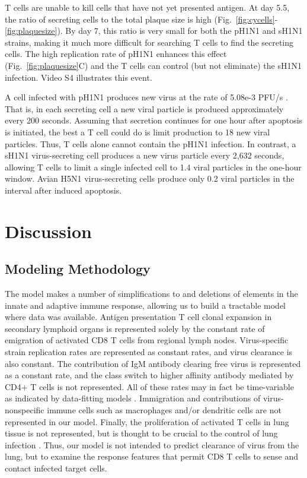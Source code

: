 \documentclass[10pt]{article}
\begin{document}
T cells are unable to kill cells that have not yet presented antigen.  At day 5.5, the ratio of secreting cells to the total plaque size is high (Fig.~\ref{fig:cycells}-\ref{fig:plaquesize}). By day 7, this ratio is very small for both the pH1N1 and sH1N1 strains, making it much more difficult for searching T cells to find the secreting cells.  The high replication rate of pH1N1 enhances this effect (Fig.~\ref{fig:plaquesize}C) and the T cells can control (but not eliminate) the sH1N1 infection.  Video S4 illustrates this event.

A cell infected with pH1N1 produces new virus at the rate of 5.08e-3 PFU/s \cite{Mitchell2011}.  That is, in each secreting cell a new viral particle is produced approximately every 200 seconds.  Assuming that secretion continues for one hour after apoptosis is initiated, the best a T cell could do is limit production to 18 new viral particles.  Thus, T cells alone cannot contain the pH1N1 infection.  In contrast, a sH1N1 virus-secreting cell produces a new virus particle every 2,632 seconds, allowing T cells to limit a single infected cell to 1.4 viral particles in the one-hour window.  Avian H5N1 virus-secreting cells produce only 0.2 viral particles in the interval after induced apoptosis. 


\section*{Discussion}

\subsection*{Modeling Methodology}

The model makes a number of simplifications to and deletions of elements in the innate and adaptive immune response, allowing us to build a tractable model where data was available.  Antigen presentation T cell clonal expansion in secondary lymphoid organs is represented solely by the constant rate of emigration of activated CD8 T cells from regional lymph nodes.  Virus-specific strain replication rates are represented as constant rates, and virus clearance is also constant.  The contribution of IgM antibody clearing free virus is represented as a constant rate, and the class switch to higher affinity antibody mediated by CD4+ T cells is not represented.  All of these rates may in fact be time-variable as indicated by data-fitting models \cite{Wu2011}.  Immigration and contributions of virus-nonspecific immune cells such as macrophages and/or dendritic cells are not represented in our model.  Finally, the proliferation of activated T cells in lung tissue is not represented, but is thought to be crucial to the control of lung infection \cite{Miao2010}.  Thus, our model is not intended to predict clearance of virus from the lung, but to examine the response  features that permit CD8 T cells to sense and contact infected target cells.
\end{document}
